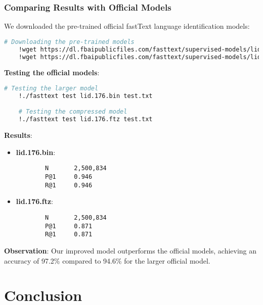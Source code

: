\documentclass{beamer}
\begin{document}
\begin{frame}[fragile]
    \frametitle{Comparing Results with Official Models}
    We downloaded the pre-trained official fastText language identification models:

    \begin{lstlisting}[language=bash]
    # Downloading the pre-trained models
    !wget https://dl.fbaipublicfiles.com/fasttext/supervised-models/lid.176.bin
    !wget https://dl.fbaipublicfiles.com/fasttext/supervised-models/lid.176.ftz
    \end{lstlisting}

    \textbf{Testing the official models}:

    \begin{lstlisting}[language=bash]
    # Testing the larger model
    !./fasttext test lid.176.bin test.txt

    # Testing the compressed model
    !./fasttext test lid.176.ftz test.txt
    \end{lstlisting}

    \textbf{Results}:

    \begin{itemize}
        \item \textbf{lid.176.bin}:
        \begin{lstlisting}
        N       2,500,834
        P@1     0.946
        R@1     0.946
        \end{lstlisting}

        \item \textbf{lid.176.ftz}:
        \begin{lstlisting}
        N       2,500,834
        P@1     0.871
        R@1     0.871
        \end{lstlisting}
    \end{itemize}

    \textbf{Observation}: Our improved model outperforms the official models, achieving an accuracy of 97.2\% compared to 94.6\% for the larger official model.
\end{frame}

\section{Conclusion}
\end{document}
